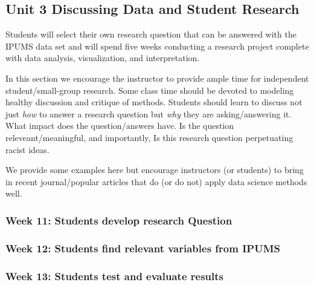\documentclass[
]{book}
\begin{document}
\hypertarget{unit-3-discussing-data-and-student-research}{%
\subsection*{Unit 3 Discussing Data and Student Research}\label{unit-3-discussing-data-and-student-research}}

Students will select their own research question that can be answered with the IPUMS data set and will spend five weeks conducting a research project complete with data analysis, visualization, and interpretation.

In this section we encourage the instructor to provide ample time for independent student/small-group research. Some class time should be devoted to modeling healthy discussion and critique of methods. Students should learn to discuss not just \emph{how} to answer a research question but \emph{why} they are asking/answering it. What impact does the question/answers have. Is the question releveant/meaningful, and importantly, Is this research question perpetuating racist ideas.

We provide some examples here but encourage instructors (or students) to bring in recent journal/popular articles that do (or do not) apply data science methods well.

\hypertarget{week-11-students-develop-research-question}{%
\subsubsection*{Week 11: Students develop research Question}\label{week-11-students-develop-research-question}}

\hypertarget{week-12-students-find-relevant-variables-from-ipums}{%
\subsubsection*{Week 12: Students find relevant variables from IPUMS}\label{week-12-students-find-relevant-variables-from-ipums}}

\hypertarget{week-13-students-test-and-evaluate-results}{%
\subsubsection*{Week 13: Students test and evaluate results}\label{week-13-students-test-and-evaluate-results}}
\end{document}
